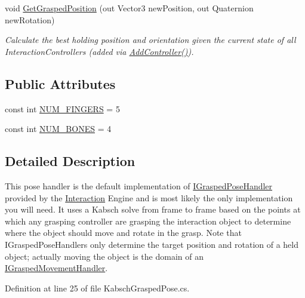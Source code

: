 \begin{DoxyCompactItemize}
void \mbox{\hyperlink{class_leap_1_1_unity_1_1_interaction_1_1_kabsch_grasped_pose_ad691816b67d028dfc7c69e9c782c6eef}{Get\+Grasped\+Position}} (out Vector3 new\+Position, out Quaternion new\+Rotation)
\begin{DoxyCompactList}\small\item\em Calculate the best holding position and orientation given the current state of all Interaction\+Controllers (added via \mbox{\hyperlink{class_leap_1_1_unity_1_1_interaction_1_1_kabsch_grasped_pose_a48e190a6d9cadcaf3340d339ac61d464}{Add\+Controller()}}). \end{DoxyCompactList}\end{DoxyCompactItemize}
\subsection*{Public Attributes}
\begin{DoxyCompactItemize}
\item 
const int \mbox{\hyperlink{class_leap_1_1_unity_1_1_interaction_1_1_kabsch_grasped_pose_ae5b0bd25b1f36d85944840c5178349ce}{N\+U\+M\+\_\+\+F\+I\+N\+G\+E\+RS}} = 5
\item 
const int \mbox{\hyperlink{class_leap_1_1_unity_1_1_interaction_1_1_kabsch_grasped_pose_a6828cd893797a0af43bd25a7e13c5916}{N\+U\+M\+\_\+\+B\+O\+N\+ES}} = 4
\end{DoxyCompactItemize}


\subsection{Detailed Description}
This pose handler is the default implementation of \mbox{\hyperlink{interface_leap_1_1_unity_1_1_interaction_1_1_i_grasped_pose_handler}{I\+Grasped\+Pose\+Handler}} provided by the \mbox{\hyperlink{namespace_leap_1_1_unity_1_1_interaction}{Interaction}} Engine and is most likely the only implementation you will need. It uses a Kabsch solve from frame to frame based on the points at which any grasping controller are grasping the interaction object to determine where the object should move and rotate in the grasp. Note that I\+Grasped\+Pose\+Handlers only determine the target position and rotation of a held object; actually moving the object is the domain of an \mbox{\hyperlink{interface_leap_1_1_unity_1_1_interaction_1_1_i_grasped_movement_handler}{I\+Grasped\+Movement\+Handler}}. 



Definition at line 25 of file Kabsch\+Grasped\+Pose.\+cs.




